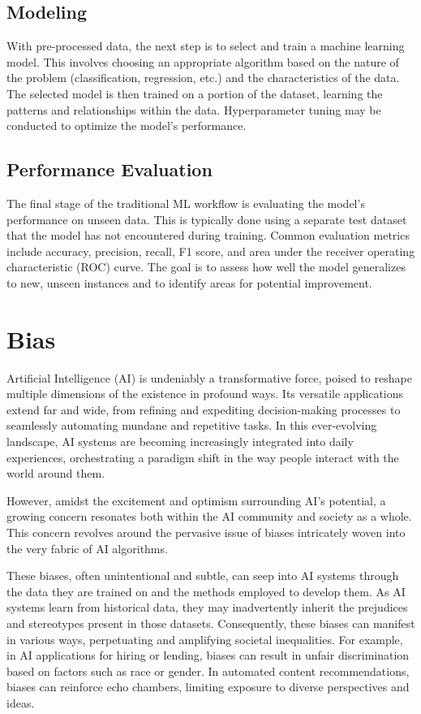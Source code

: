 \documentclass[12pt,a4paper,openright,twoside]{book}
\begin{document}
\subsection{Modeling}

With pre-processed data, the next step is to select and train a machine learning model. This involves choosing an appropriate algorithm based on the nature of the problem (classification, regression, etc.) and the characteristics of the data. The selected model is then trained on a portion of the dataset, learning the patterns and relationships within the data. Hyperparameter tuning may be conducted to optimize the model's performance.

\subsection{Performance Evaluation}

The final stage of the traditional ML workflow is evaluating the model's performance on unseen data. This is typically done using a separate test dataset that the model has not encountered during training. Common evaluation metrics include accuracy, precision, recall, F1 score, and area under the receiver operating characteristic (ROC) curve. The goal is to assess how well the model generalizes to new, unseen instances and to identify areas for potential improvement.

\newpage
\section{Bias}

Artificial Intelligence (AI) is undeniably a transformative force, poised to reshape multiple dimensions of the existence in profound ways. Its versatile applications extend far and wide, from refining and expediting decision-making processes to seamlessly automating mundane and repetitive tasks. In this ever-evolving landscape, AI systems are becoming increasingly integrated into daily experiences, orchestrating a paradigm shift in the way people interact with the world around them. 

However, amidst the excitement and optimism surrounding AI's potential, a growing concern resonates both within the AI community and society as a whole. This concern revolves around the pervasive issue of biases intricately woven into the very fabric of AI algorithms. 

These biases, often unintentional and subtle, can seep into AI systems through the data they are trained on and the methods employed to develop them. As AI systems learn from historical data, they may inadvertently inherit the prejudices and stereotypes present in those datasets. Consequently, these biases can manifest in various ways, perpetuating and amplifying societal inequalities. For example, in AI applications for hiring or lending, biases can result in unfair discrimination based on factors such as race or gender. In automated content recommendations, biases can reinforce echo chambers, limiting exposure to diverse perspectives and ideas. 
\end{document}
